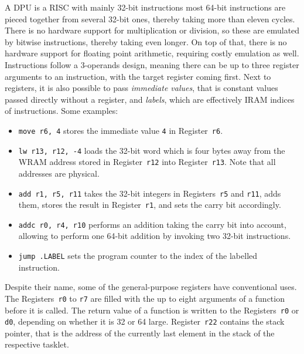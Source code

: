 A \ac{DPU} is a \ac{RISC} with mainly 32-bit instructions \Dash most 64-bit instructions are pieced together from several 32-bit ones, thereby taking more than eleven cycles.
There is no hardware support for multiplication or division, so these are emulated by bitwise instructions, thereby taking even longer.
On top of that, there is no hardware support for floating point arithmetic, requiring costly emulation as well.
Instructions follow a 3-operands design, meaning there can be up to three register arguments to an instruction, with the target register coming first.
Next to registers, it is also possible to pass \emph{immediate values}, that is constant values passed directly without a register, and \emph{labels}, which are effectively \ac{IRAM} indices of instructions.
Some examples:
\begin{itemize}
	\item
	\lstinline|move r6, 4| stores the immediate value \lstinline|4| in Register~\lstinline|r6|.

	\item
	\lstinline|lw r13, r12, -4| loads the 32-bit word which is four bytes away from the \ac{WRAM} address stored in Register~\lstinline|r12| into Register~\lstinline|r13|.
	Note that all addresses are physical.

	\item
	\lstinline|add r1, r5, r11| takes the 32-bit integers in Registers~\lstinline|r5| and \lstinline|r11|, adds them, stores the result in Register~\lstinline|r1|, and sets the carry bit accordingly.

	\item
	\lstinline|addc r0, r4, r10| performs an addition taking the carry bit into account, allowing to perform one 64-bit addition by invoking two 32-bit instructions.

	\item
	\lstinline|jump .LABEL| sets the program counter to the index of the labelled instruction.
\end{itemize}
Despite their name, some of the general-purpose registers have conventional uses.
The Registers~\lstinline|r0| to \lstinline|r7| are filled with the up to eight arguments of a function before it is called.
The return value of a function is written to the Registers~\lstinline|r0| or \lstinline|d0|, depending on whether it is \qty{32}{\bit} or \qty{64}{\bit} large.
Register~\lstinline|r22| contains the stack pointer, that is the address of the currently last element in the stack of the respective tasklet.
